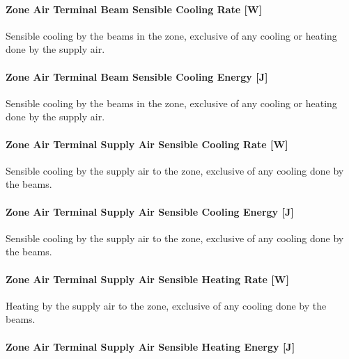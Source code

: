 \paragraph{Zone Air Terminal Beam Sensible Cooling Rate {[}W{]}}\label{zone-air-terminal-beam-sensible-cooling-rate-w-1}

Sensible cooling by the beams in the zone, exclusive of any cooling or heating done by the supply air.

\paragraph{Zone Air Terminal Beam Sensible Cooling Energy {[}J{]}}\label{zone-air-terminal-beam-sensible-cooling-energy-j-1}

Sensible cooling by the beams in the zone, exclusive of any cooling or heating done by the supply air.

\paragraph{Zone Air Terminal Supply Air Sensible Cooling Rate {[}W{]}}\label{zone-air-terminal-supply-air-sensible-cooling-rate-w}

Sensible cooling by the supply air to the zone, exclusive of any cooling done by the beams.

\paragraph{Zone Air Terminal Supply Air Sensible Cooling Energy {[}J{]}}\label{zone-air-terminal-supply-air-sensible-cooling-energy-j}

Sensible cooling by the supply air to the zone, exclusive of any cooling done by the beams.

\paragraph{Zone Air Terminal Supply Air Sensible Heating Rate {[}W{]}}\label{zone-air-terminal-supply-air-sensible-heating-rate-w}

Heating by the supply air to the zone, exclusive of any cooling done by the beams.

\paragraph{Zone Air Terminal Supply Air Sensible Heating Energy {[}J{]}}\label{zone-air-terminal-supply-air-sensible-heating-energy-j}

